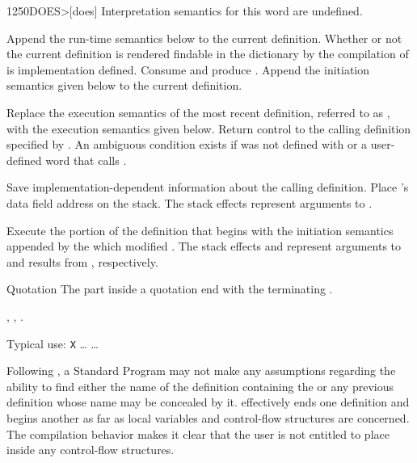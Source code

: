 \begin{worddef}[DOES]{1250}{DOES>}[does]
\interpret
	Interpretation semantics for this word are undefined.

\compile

	Append the run-time semantics below to the current definition.
	Whether or not the current definition is rendered findable in
	the dictionary by the compilation of  is
	implementation defined. Consume  and
	produce . Append the initiation semantics
	given below to the current definition.

\runtime
	\stack{}{}

	Replace the execution semantics of the most recent definition,
	referred to as , with the  execution
	semantics given below. Return control to the calling definition
	specified by . An ambiguous condition exists
	if  was not defined with  or a
	user-defined word that calls .

\init

	Save implementation-dependent information 
	about the calling definition. Place 's data field
	address on the stack. The stack effects  represent
	arguments to .

\execute[name]

	Execute the portion of the definition that begins with the
	initiation semantics appended by the  which modified
	. The stack effects  and 
	represent arguments to and results from ,
	respectively.

\item[Quotation]
	The  part inside a quotation
	end with the terminating \word[tools]{;]}.
	
\see {},
	\wref{tools:;]}{},
	.

	\begin{rationale} %
		Typical use:
			\word{:} \texttt{X} {\ldots}  {\ldots} \word{;}

		Following , a Standard Program may not make any
		assumptions regarding the ability to find either the name of
		the definition containing the  or any previous
		definition whose name may be concealed by it. 
		effectively ends one definition and begins another as far as
		local variables and control-flow structures are concerned.
		The compilation behavior makes it clear that the user is not
		entitled to place  inside any control-flow
		structures.
	\end{rationale}


\end{worddef}
